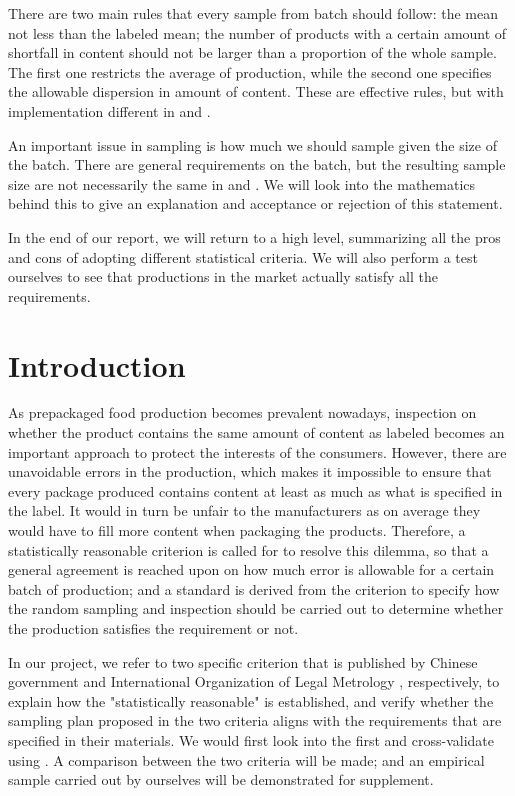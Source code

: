 \documentclass[12pt]{article}
\begin{document}
There are two main rules that every sample from batch should follow: the mean not less than the labeled mean; the number of products with a certain amount of shortfall in content should not be larger than a proportion of the whole sample. The first one restricts the average of production, while the second one specifies the allowable dispersion in amount of content. These are effective rules, but with implementation different in \cite{JJF2005} and \cite{OIML2016}.

An important issue in sampling is how much we should sample given the size of the batch. There are general requirements on the batch, but the resulting sample size are not necessarily the same in \cite{JJF2005} and \cite{OIML2016}. We will look into the mathematics behind this to give an explanation and acceptance or rejection of this statement. 

In the end of our report, we will return to a high level, summarizing all the pros and cons of adopting different statistical criteria. We will also perform a test ourselves to see that productions in the market actually satisfy all the requirements. 

\newpage

\section{Introduction}

As prepackaged food production becomes prevalent nowadays, inspection on whether the product contains the same amount of content as labeled becomes an important approach to protect the interests of the consumers. However, there are unavoidable errors in the production, which makes it impossible to ensure that every package produced contains content at least as much as what is specified in the label. It would in turn be unfair to the manufacturers as on average they would have to fill more content when packaging the products. Therefore, a statistically reasonable criterion is called for to resolve this dilemma, so that a general agreement is reached upon on how much error is allowable for a certain batch of production; and a standard is derived from the criterion to specify how the random sampling and inspection should be carried out to determine whether the production satisfies the requirement or not.

In our project, we refer to two specific criterion that is published by Chinese government \cite{JJF2005} and International Organization of Legal Metrology \cite{OIML2016}, respectively, to explain how the "statistically reasonable" is established, and verify whether the sampling plan proposed in the two criteria aligns with the requirements that are specified in their materials. We would first look into the \cite{JJF2005} first and cross-validate using \cite{OIML2016}. A comparison between the two criteria will be made; and an empirical sample carried out by ourselves will be demonstrated for supplement. 
\end{document}
